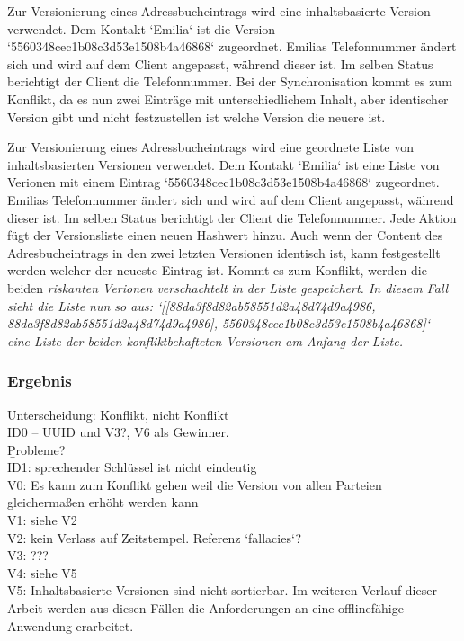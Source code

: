 \begin{description}[leftmargin=0.5cm,style=nextline]
  \item[Szenario V5:]%
  Zur Versionierung eines Adressbucheintrags wird eine inhaltsbasierte Version verwendet. Dem Kontakt `Emilia` ist die Version `5560348cec1b08c3d53e1508b4a46868` zugeordnet. Emilias Telefonnummer ändert sich und wird auf dem Client angepasst, während dieser  ist. Im selben Status berichtigt der Client die Telefonnummer. Bei der Synchronisation kommt es zum Konflikt, da es nun zwei Einträge mit unterschiedlichem Inhalt, aber identischer Version gibt und nicht festzustellen ist welche Version die neuere ist.\\
  \item[Szenario V6:] %
  Zur Versionierung eines Adressbucheintrags wird eine geordnete Liste von inhaltsbasierten Versionen verwendet.
  Dem Kontakt `Emilia` ist eine Liste von Verionen mit einem Eintrag `5560348cec1b08c3d53e1508b4a46868` zugeordnet. Emilias Telefonnummer ändert sich und wird auf dem Client angepasst, während dieser  ist. Im selben Status berichtigt der Client die Telefonnummer. Jede Aktion fügt der Versionsliste einen neuen Hashwert hinzu. Auch wenn der Content des Adresbucheintrags in den zwei letzten Versionen identisch ist, kann festgestellt werden welcher der neueste Eintrag ist. Kommt es zum Konflikt, werden die beiden \it{riskanten} Verionen verschachtelt in der Liste gespeichert. In diesem Fall sieht die Liste nun so aus: `[[88da3f8d82ab58551d2a48d74d9a4986, 88da3f8d82ab58551d2a48d74d9a4986], 5560348cec1b08c3d53e1508b4a46868]` -- eine Liste der beiden konfliktbehafteten Versionen am Anfang der Liste.
\end{description}
%
%
\subsubsection*{Ergebnis}
Unterscheidung: Konflikt, nicht Konflikt\\
ID0 -- UUID und V3?, V6 als Gewinner.\\
\b{Probleme?}\\
ID1: sprechender Schlüssel ist nicht eindeutig\\
V0: Es kann zum Konflikt gehen weil die Version von allen Parteien gleichermaßen erhöht werden kann\\
V1: siehe V2\\
V2: kein Verlass auf Zeitstempel. Referenz `fallacies`?\\
V3: ??? \\
V4: siehe V5\\
V5: Inhaltsbasierte Versionen sind nicht sortierbar.
Im weiteren Verlauf dieser Arbeit werden aus diesen Fällen die Anforderungen an eine offlinefähige Anwendung erarbeitet.